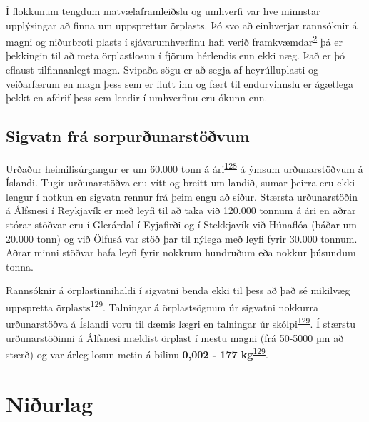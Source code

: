 \documentclass[icelandic,]{book}
\begin{document}
Í flokkunum tengdum matvælaframleiðslu og umhverfi var hve minnstar upplýsingar að finna um uppsprettur örplasts. Þó svo að einhverjar rannsóknir á magni og niðurbroti plasts í sjávarumhverfinu hafi verið framkvæmdar\textsuperscript{\protect\hyperlink{ref-Andrady2017}{2}} þá er þekkingin til að meta örplastlosun í fjörum hérlendis enn ekki næg. Það er þó eflaust tilfinnanlegt magn. Svipaða sögu er að segja af heyrúlluplasti og veiðarfærum en magn þess sem er flutt inn og fært til endurvinnslu er ágætlega þekkt en afdrif þess sem lendir í umhverfinu eru ókunn enn. 

\hypertarget{sigvatn-fra-sorpurunarstovum}{%
\subsection*{Sigvatn frá sorpurðunarstöðvum}\label{sigvatn-fra-sorpurunarstovum}}

Urðaður heimilisúrgangur er um 60.000 tonn á ári\textsuperscript{\protect\hyperlink{ref-tollurinn2}{128}} á ýmsum urðunarstöðvum á Íslandi. Tugir urðunarstöðva eru vítt og breitt um landið, sumar þeirra eru ekki lengur í notkun en sigvatn rennur frá þeim engu að síður. Stærsta urðunarstöðin á Álfsnesi í Reykjavík er með leyfi til að taka við 120.000 tonnum á ári en aðrar stórar stöðvar eru í Glerárdal í Eyjafirði og í Stekkjavík við Húnaflóa (báðar um 20.000 tonn) og við Ölfusá var stöð þar til nýlega með leyfi fyrir 30.000 tonnum. Aðrar minni stöðvar hafa leyfi fyrir nokkrum hundruðum eða nokkur þúsundum tonna.

Rannsóknir á örplastinnihaldi í sigvatni benda ekki til þess að það sé mikilvæg uppspretta örplasts\textsuperscript{\protect\hyperlink{ref-Praagh1277395}{129}}. Talningar á örplastsögnum úr sigvatni nokkurra urðunarstöðva á Íslandi voru til dæmis lægri en talningar úr skólpi\textsuperscript{\protect\hyperlink{ref-Praagh1277395}{129}}. Í stærstu urðunarstöðinni á Álfsnesi mældist örplast í mestu magni (frá 50-5000 µm að stærð) og var árleg losun metin á bilinu \textbf{0,002 - 177 kg}\textsuperscript{\protect\hyperlink{ref-Praagh1277395}{129}}.


\hypertarget{samantekt-og-lokaor}{%
\section*{Niðurlag}\label{samantekt-og-lokaor}}
\end{document}
